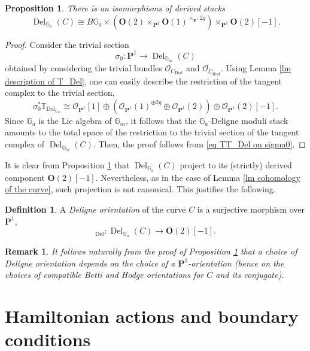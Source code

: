 \documentclass[11pt, a4paper]{amsart}
\numberwithin{equation}{section}
\newtheorem{proposition}[theorem]{Proposition}
\newtheorem{remark}[theorem]{Remark}
\theoremstyle{definition}
\newtheorem{definition}[theorem]{Definition}
\theoremstyle{remark}
\DeclareMathOperator{\Deligne}{Del}
\DeclareMathOperator{\Hod}{Hod}
\DeclareMathOperator{\Del}{Del}
\newcommand{\Oo}{\mathcal{O}}
\newcommand{\OO}{\mathbf{O}}
\renewcommand{\P}{\mathbf{P}}
\newcommand{\ol}[1]{\overline{#1}}
\newcommand{\GG}{\mathbb{G}}
\newcommand{\TT}{\mathbb{T}}
\renewcommand{\to}{\longrightarrow}
\begin{document}
\begin{proposition} \label{pr Del_Ga}
There is an isomorphisms of derived stacks
\[
\Deligne_{\GG_a}(C) \cong B\GG_a \times \left ( \OO(2) \times_{\P^1} \OO(1)^{\times_{\P^1} 2g} \right ) \times_{\P^1} \OO(2)[-1].
\]
\end{proposition}

\begin{proof}
Consider the trivial section
\[
\sigma_0 : \P^1 \to \Del_{\GG_m}(C)
\]
obtained by considering the trivial bundles $\Oo_{C_{\Hod}}$ and $\Oo_{\ol C_{\Hod}}$. Using Lemma \ref{lm description of T_Del}, one can easily describe the restriction of the tangent complex to the trivial section,
\begin{equation} \label{eq TT_Del on sigma0}
\sigma_0^* \TT_{\Del_{\GG_m}} \cong \Oo_{\P^1}[1] \oplus \left ( \Oo_{\P^1}(1)^{\oplus 2g} \oplus \Oo_{\P^1}(2) \right ) \oplus \Oo_{\P^1}(2)[-1]. 
\end{equation}
Since $\GG_a$ is the Lie algebra of $\GG_m$, it follows that the $\GG_a$-Deligne moduli stack amounts to the total space of the restriction to the trivial section of the tangent complex of $\Deligne_{\GG_m}(C)$. Then, the proof follows from \eqref{eq TT_Del on sigma0}.
\end{proof}

It is clear from Proposition \ref{pr Del_Ga} that $\Del_{\GG_a}(C)$ project to its (strictly) derived component $\OO(2)[-1]$. Nevertheless, as in the case of Lemma \ref{lm cohomology of the curve}, such projection is not canonical. This justifies the following. 

\begin{definition} \label{df Del orientation}
    A \textit{Deligne orientation} of the curve $C$ is a surjective morphism over $\P^1$,
    \begin{equation}
        [C]_{\Del}: \Del_{\GG_a}(C) \to  \OO(2)[-1].
    \end{equation}
\end{definition}

\begin{remark}
It follows naturally from the proof of Proposition \ref{pr Del_Ga} that a choice of Deligne orientation depends on the choice of a $\P^1$-orientation (hence on the choices of compatible Betti and Hodge orientations for $C$ and its conjugate).
\end{remark}



\section{Hamiltonian actions and boundary conditions}
\label{section TwB}
\end{document}
